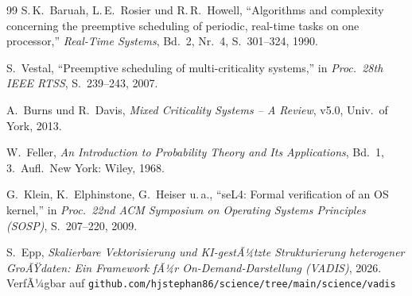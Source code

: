 ﻿\documentclass[a4paper,12pt]{scrreprt}
\theoremstyle{definition}
\begin{document}
\begin{thebibliography}{99}
		S.\,K.\ Baruah, L.\,E.\ Rosier und R.\,R.\ Howell,
		``Algorithms and complexity concerning the preemptive scheduling of
		periodic, real-time tasks on one processor,''
		\textit{Real-Time Systems}, Bd.~2, Nr.~4, S.~301--324, 1990.
		
		S.\ Vestal,
		``Preemptive scheduling of multi-criticality systems,''
		in \textit{Proc.\ 28th IEEE RTSS}, S.~239--243, 2007.
		
		A.\ Burns und R.\ Davis,
		\textit{Mixed Criticality Systems -- A Review},
		v5.0, Univ.\ of York, 2013.
		
		W.\ Feller,
		\textit{An Introduction to Probability Theory and Its Applications},
		Bd.~1, 3.~Aufl.\ New York: Wiley, 1968.

		G.\ Klein, K.\ Elphinstone, G.\ Heiser u.\,a.,
		``seL4: Formal verification of an OS kernel,''
		in \textit{Proc.\ 22nd ACM Symposium on Operating Systems Principles (SOSP)},
		S.~207--220, 2009.

		S.\ Epp,
		\textit{Skalierbare Vektorisierung und KI-gestÃ¼tzte Strukturierung heterogener
		GroÃŸdaten: Ein Framework fÃ¼r On-Demand-Darstellung (VADIS)}, 2026. VerfÃ¼gbar auf
		\texttt{github.com/hjstephan86/science/tree/main/science/vadis}
		
	\end{thebibliography}
	
\end{document}
